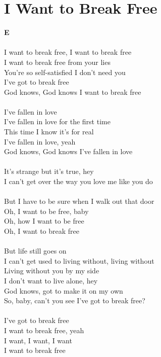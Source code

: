 \section{I Want to Break Free}
\footnotesize\textbf{E}\\
\normalsize
\\
I want to break free, I want to break free\\
I want to break free from your lies\\
You're so self-satisfied I don't need you\\
I've got to break free\\
God knows, God knows I want to break free\\
\\
I've fallen in love\\
I've fallen in love for the first time\\
This time I know it's for real\\
I've fallen in love, yeah\\
God knows, God knows I've fallen in love\\
\\
It's strange but it's true, hey\\
I can't get over the way you love me like you do\\
\\
But I have to be sure when I walk out that door\\
Oh, I want to be free, baby\\
Oh, how I want to be free\\
Oh, I want to break free\\
\\
But life still goes on\\
I can't get used to living without, living without\\
Living without you by my side\\
I don't want to live alone, hey\\
God knows, got to make it on my own\\
So, baby, can't you see I've got to break free?\\
\\
I've got to break free\\
I want to break free, yeah\\
I want, I want, I want\\
I want to break free\\
